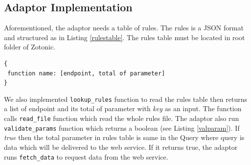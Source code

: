 \documentclass[conference]{IEEEtran}
\begin{document}
% 
%

\subsection{Adaptor Implementation}
Aforementioned, the adaptor needs a table of rules. The rules is a JSON format and structured as in Listing \ref{rulestable}. The rules table must be located in root folder of Zotonic. 

\begin{lstlisting}[caption=Structure of Rules, label=rulestable]
{
 function name: [endpoint, total of parameter]
}
\end{lstlisting}

We also implemented \texttt{lookup\_rules} function to read the rules table then returns a list of endpoint and its total of parameter with \textit{key} as an input. The function calls \texttt{read\_file} function which read the whole rules file. The adaptor also run \texttt{validate\_params} function which returns a boolean (see Listing \ref{valparam}). If \textit{true} then the total parameter in rules table is same in the Query where query is data which will be delivered to the web service. If it returns true, the adaptor runs \texttt{fetch\_data} to request data from the web service. 

\end{document}
